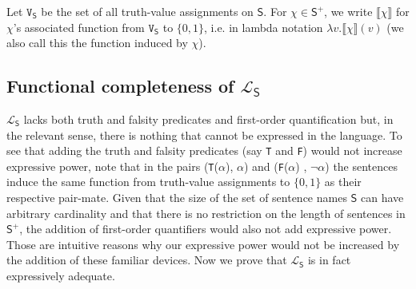 \documentclass[12pt]{article}
\theoremstyle{remark}
\newcommand{\fancy}[1]{\mathcal{#1}}
\def\S{\textsf{S}}
\def\V{\texttt{V}}
\def\L{\fancy{L}}
\begin{document}
Let $\V_\S$ be the set of all truth-value assignments on $\S$. For $\chi \in \S^{+}$, we write $\llbracket \chi\rrbracket$ for $\chi$'s associated function from $\V_\S$ to $\{0,1\}$, i.e. in lambda notation $\lambda v. \llbracket \chi\rrbracket(v)$ (we also call this the function induced by $\chi$).

\subsection{Functional completeness of $\L_\S$}

$\L_\S$ lacks both truth and falsity predicates and first-order quantification but, in the relevant sense, there is nothing that cannot be expressed in the language. To see that adding the truth and falsity predicates (say \texttt{T} and \texttt{F}) would not increase expressive power, note that in the pairs (\texttt{T}($\alpha$), $\alpha$) and  (\texttt{F}($\alpha$) , $\neg \alpha$) the sentences induce the same function from truth-value assignments to $\{0,1\}$ as their respective pair-mate. Given that the size of the set of sentence names $\S$ can have arbitrary cardinality and that there is no restriction on the length of sentences in $\S^{+}$, the addition of first-order quantifiers would also not add expressive power. Those are intuitive reasons why our expressive power would not be increased by the addition of these familiar devices. Now we prove that $\L_\S$ is in fact expressively adequate.
\end{document}
